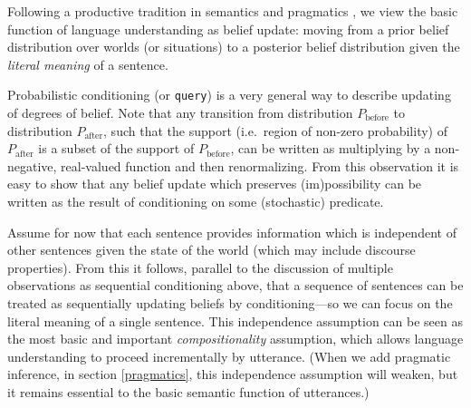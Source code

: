 \documentclass[pdfextras]{handbook}
\begin{document}
Following a productive tradition in semantics and pragmatics \citep[][etc.]{stalnaker78,lewis79,heim82}, we view the basic function of language understanding as belief update: moving from a prior belief distribution over worlds (or situations) to a posterior belief distribution given the \emph{literal meaning} of a sentence. 

Probabilistic conditioning (or \lstinline{query}) is a very general way to describe updating of degrees of belief. Note that any transition from distribution $P_{\text{before}}$ to distribution $P_{\text{after}}$, such that the support (i.e.\ region of non-zero probability) of $P_{\text{after}}$ is a subset of the support of $P_{\text{before}}$, can be written as multiplying by a non-negative, real-valued function and then renormalizing. From this observation it is easy to show that any belief update which preserves (im)possibility can be written as the result of conditioning on some (stochastic) predicate.

Assume for now that each sentence provides information which is independent of other sentences given the state of the world (which may include discourse properties). From this it follows, parallel to the discussion of multiple observations as sequential conditioning above, that a sequence of sentences can be treated as sequentially updating beliefs by conditioning---so we can focus on the literal meaning of a single sentence. This independence assumption can be seen as the most basic and important \emph{compositionality} assumption, which allows language understanding to proceed incrementally by utterance. (When we add pragmatic inference, in section \ref{pragmatics}, this independence assumption will weaken, but it remains essential to the basic semantic function of utterances.)
\end{document}
